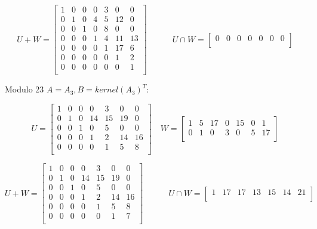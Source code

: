 \documentclass[10pt,a4paper]{report}
\begin{document}
\begin{equation*}
U+W=\begin{bmatrix}
1 & 0 & 0 & 0 & 3 & 0 & 0 \\
0 & 1 & 0 & 4 & 5 & 12 & 0 \\
0 & 0 & 1 & 0 & 8 & 0 & 0 \\
0 & 0 & 0 & 1 & 4 & 11 & 13 \\
0 & 0 & 0 & 0 & 1 & 17 & 6 \\
0 & 0 & 0 & 0 & 0 & 1 & 2 \\
0 & 0 & 0 & 0 & 0 & 0 & 1 \\
\end{bmatrix}
\quad \quad \quad
U \cap W=\begin{bmatrix}
0 & 0 & 0 & 0 & 0 & 0 & 0 \\
\end{bmatrix}
\end{equation*}

\vspace{1cm}

Modulo 23 $A=A_3, B=kernel(A_3)^T$:


\begin{equation*}
U=\begin{bmatrix}
1 & 0 & 0 & 0 & 3 & 0 & 0 \\
0 & 1 & 0 & 14 & 15 & 19 & 0 \\
0 & 0 & 1 & 0 & 5 & 0 & 0 \\
0 & 0 & 0 & 1 & 2 & 14 & 16 \\
0 & 0 & 0 & 0 & 1 & 5 & 8 \\
\end{bmatrix}
\quad
W=\begin{bmatrix}
1 & 5 & 17 & 0 & 15 & 0 & 1 \\
0 & 1 & 0 & 3 & 0 & 5 & 17 \\
\end{bmatrix}
\end{equation*}

\begin{equation*}
U+W=\begin{bmatrix}
1 & 0 & 0 & 0 & 3 & 0 & 0 \\
0 & 1 & 0 & 14 & 15 & 19 & 0 \\
0 & 0 & 1 & 0 & 5 & 0 & 0 \\
0 & 0 & 0 & 1 & 2 & 14 & 16 \\
0 & 0 & 0 & 0 & 1 & 5 & 8 \\
0 & 0 & 0 & 0 & 0 & 1 & 7 \\
\end{bmatrix}
\quad \quad \quad
U \cap W=\begin{bmatrix}
1 	& 17 & 17 & 13 & 15 & 14 & 21 \\
\end{bmatrix}
\end{equation*}
\end{document}
